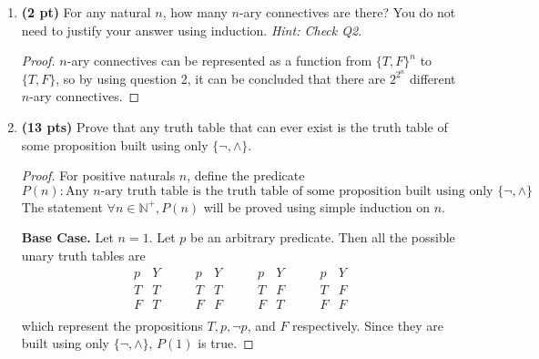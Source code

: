 \documentclass[11pt]{article}
\begin{document}
    \begin{enumerate}[label=\alph*)]
        \item \textbf{(2 pt)} For any natural $n$, how many $n$-ary connectives are there? You do not need to justify your answer using induction. \emph{Hint: Check Q2}.

        \begin{proof}
            \(n\)-ary connectives can be represented as a function from \(\{T, F\}^n\) to \(\{T, F\}\), so by using question 2, it can be concluded that there are \(2^{2^n}\) different \(n\)-ary connectives.

        \end{proof}
        \item \textbf{(13 pts)} Prove that any truth table that can ever exist is the truth table of some proposition built using only $\{\neg, \wedge\}$.
        
        \begin{proof}
            For positive naturals \(n\), define the predicate
            \[
                P(n) \colon \text{Any } n \text{-ary truth table is the truth table of some proposition built using only } \{ \neg, \land \}
            \] 
            The statement \(\forall n \in \mathbb{N}^+, P(n)\) will be proved using simple induction on \(n\).

            \textbf{Base Case.} Let \(n = 1\). Let \(p\) be an arbitrary predicate. Then all the possible unary truth tables are
            \[
                \begin{array}{c|c}
                    p &  Y \\
                    \hline
                    T &  T \\
                    F &  T \\
                \end{array}
                \qquad
                \begin{array}{c|c}
                    p &  Y \\
                    \hline
                    T &  T \\
                    F &  F \\
                \end{array}
                \qquad
                \begin{array}{c|c}
                    p &  Y \\
                    \hline
                    T &  F \\
                    F &  T \\
                \end{array}
                \qquad
                \begin{array}{c|c}
                    p &  Y \\
                    \hline
                    T &  F \\
                    F &  F \\
                \end{array}
            \]
            which represent the propositions \(T, p, \neg p\), and \(F\) respectively. Since they are built using only \(\{\neg , \land\}\), \(P(1)\) is true.


\end{proof}
\end{enumerate}
\end{document}
